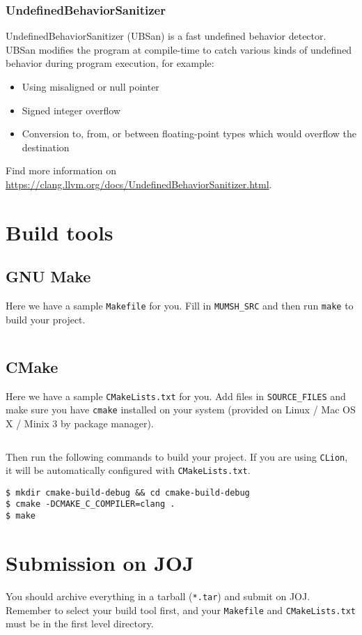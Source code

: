 \documentclass[11pt,a4paper]{article}
\begin{document}
\subsubsection{UndefinedBehaviorSanitizer}

UndefinedBehaviorSanitizer (UBSan) is a fast undefined behavior detector. UBSan modifies the program at compile-time to catch various kinds of undefined behavior during program execution, for example:

\begin{itemize}
	\item Using misaligned or null pointer
	\item Signed integer overflow
	\item Conversion to, from, or between floating-point types which would overflow the destination
\end{itemize}

\noindent Find more information on \url{https://clang.llvm.org/docs/UndefinedBehaviorSanitizer.html}.

\section{Build tools}

\subsection{GNU Make}

Here we have a sample \texttt{Makefile} for you. Fill in \texttt{MUMSH\_SRC} and then run \texttt{make} to build your project.

\inputminted{makefile}{Makefile}


\subsection{CMake}

Here we have a sample \texttt{CMakeLists.txt} for you. Add files in \texttt{SOURCE\_FILES} and make sure you have \texttt{cmake} installed on your system (provided on Linux / Mac OS X / Minix 3 by package manager).

\inputminted{cmake}{CMakeLists.txt}

\noindent Then run the following commands to build your project. If you are using \texttt{CLion}, it will be automatically configured with \texttt{CMakeLists.txt}.

\begin{verbatim}
$ mkdir cmake-build-debug && cd cmake-build-debug
$ cmake -DCMAKE_C_COMPILER=clang . 
$ make
\end{verbatim}

\section{Submission on JOJ}

You should archive everything in a tarball (\texttt{*.tar}) and submit on JOJ. Remember to select your build tool first, and your \texttt{Makefile} and \texttt{CMakeLists.txt} must be in the first level directory. 
\end{document}
